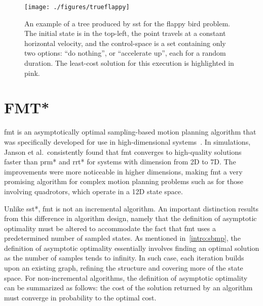 \begin{figure}[hb]
    \centering
    \texttt{[image: ./figures/trueflappy]}
    \caption[SST Flappy Bird Example]{An example of a tree produced by \gls{sst} for the flappy bird problem. The initial state is in the top-left, the point travels at a constant horizontal velocity, and the control-space is a set containing only two options: ``do nothing'', or ``accelerate up'', each for a random duration. The least-cost solution for this execution is highlighted in pink.}
\label{fig:flappy}
\end{figure}


\section{FMT*}

\gls{fmt} is an asymptotically optimal sampling-based motion planning algorithm that was specifically developed for use in high-dimensional systems~\cite{Janson2015}. In simulations, Janson et al.\ consistently found that \gls{fmt} converges to high-quality solutions faster than \gls{prm}* and \gls{rrt}* for systems with dimension from 2D to 7D. The improvements were more noticeable in higher dimensions, making \gls{fmt} a very promising algorithm for complex motion planning problems such as for those involving quadrotors, which operate in a 12D state space.

Unlike \gls{sst}*, \gls{fmt} is not an incremental algorithm. An important distinction results from this difference in algorithm design, namely that the definition of asymptotic optimality must be altered to accommodate the fact that \gls{fmt} uses a predetermined number of sampled states. As mentioned in~\ref{intro:sbmp}, the definition of asymptotic optimality essentially involves finding an optimal solution as the number of samples tends to infinity. In such case, each iteration builds upon an existing graph, refining the structure and covering more of the state space. For non-incremental algorithms, the definition of asymptotic optimality can be summarized as follows: the cost of the solution returned by an algorithm must converge in probability to the optimal cost.

